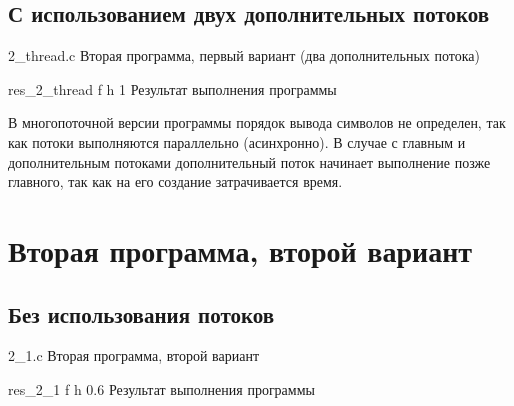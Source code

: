 
\clearpage

\subsection{С использованием двух дополнительных потоков}

{2_thread.c} %
{Вторая программа, первый вариант (два дополнительных потока)} %

\clearpage

{res_2_thread} %
{f} %
{h} %
{1\textwidth} %
{Результат выполнения программы} %


В многопоточной версии программы порядок вывода символов не определен, так как потоки выполняются параллельно (асинхронно).
В случае с главным и дополнительным потоками дополнительный поток начинает выполнение позже главного, так как на его создание затрачивается время.

\clearpage

\section{Вторая программа, второй вариант}

\subsection{Без использования потоков}

{2_1.c} %
{Вторая программа, второй вариант} %

\clearpage


{res_2_1} %
{f} %
{h} %
{0.6\textwidth} %
{Результат выполнения программы} %


